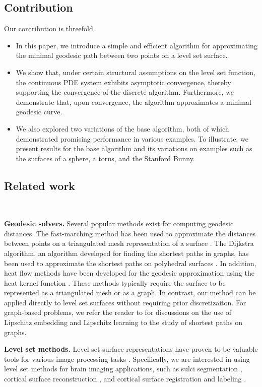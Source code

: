 \documentclass[12pt]{amsart}
\theoremstyle{definition}
\theoremstyle{remark}
\numberwithin{equation}{section}
\numberwithin{equation}{section}
\begin{document}
\subsection{Contribution}
Our contribution is threefold.
\begin{itemize} 
\item In this paper, we introduce a simple and efficient algorithm for approximating the minimal geodesic path between two points on a level set surface.
\item We show that, under certain structural assumptions on the level set function, the continuous PDE system exhibits asymptotic convergence, thereby supporting the convergence of the discrete algorithm. Furthermore, we demonstrate that, upon convergence, the algorithm approximates a minimal geodesic curve. 
\item We also explored two variations of the base algorithm, both of which demonstrated promising performance in various examples. To illustrate, we present results for the base algorithm and its variations on examples such as the surfaces of a sphere, a torus, and the Stanford Bunny.
\end{itemize} 

\subsection{Related work} ${}$

{\bf Geodesic solvers.} 
Several popular methods exist for computing geodesic distances. The fast-marching method has been used to approximate the distances between points on a triangulated mesh representation of a surface \cite{Kimmel:1998}. The Dijkstra algorithm, an algorithm developed for finding the shortest paths in graphs, has been used to approximate the shortest paths on polyhedral surfaces \cite{Monneau:2010}. 
In addition, heat flow methods have been developed for the geodesic approximation using the heat kernel function \cite{Crane:2013}.
These methods typically require the surface to be represented as a triangulated mesh or as a graph. In contrast, our method can be applied directly to level set surfaces without requiring prior discretizaiton. For graph-based problems, we refer the reader to \cite{Chu:2017, Bungert:2023} for discussions on the use of Lipschitz embedding and Lipschitz learning to the study of  shortest paths on graphs. 

{\bf Level set methods.} Level set surface representations have proven to be valuable tools for various image processing tasks \cite{Osher:2003a}. Specifically, we are interested in using level set methods for brain imaging applications, such as sulci segmentation \cite{Torkaman:2017}, cortical surface reconstruction \cite{Cruz:2020a}, and cortical surface registration and labeling \cite{Joshi:2012}.
\end{document}
